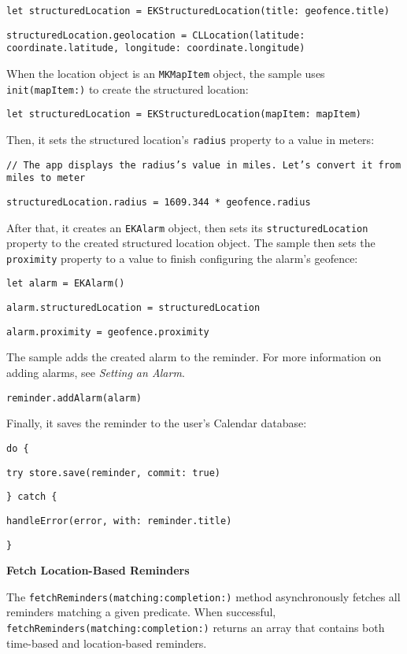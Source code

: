 \documentclass{article}
\begin{document}
\noindent
\texttt{let structuredLocation = EKStructuredLocation(title: geofence.title)}

\noindent
\texttt{structuredLocation.geolocation = CLLocation(latitude: coordinate.latitude, longitude: coordinate.longitude)}

\noindent
When the location object is an \texttt{MKMapItem} object, the sample uses \texttt{init(mapItem:)} to create the structured location:

\noindent
\texttt{let structuredLocation = EKStructuredLocation(mapItem: mapItem)}

\noindent
Then, it sets the structured location's \texttt{radius} property to a value in meters:

\noindent
\texttt{// The app displays the radius's value in miles. Let's convert it from miles to meter}

\noindent
\texttt{structuredLocation.radius = 1609.344 * geofence.radius}

\noindent
After that, it creates an \texttt{EKAlarm} object, then sets its \texttt{structuredLocation} property to the created structured location object. The sample then sets the \texttt{proximity} property to a value to finish configuring the alarm's geofence:

\noindent
\texttt{let alarm = EKAlarm()}

\noindent
\texttt{alarm.structuredLocation = structuredLocation}

\noindent
\texttt{alarm.proximity = geofence.proximity}

\noindent
The sample adds the created alarm to the reminder. For more information on adding alarms, see \textit{Setting an Alarm}.

\noindent
\texttt{reminder.addAlarm(alarm)}

\noindent
Finally, it saves the reminder to the user's Calendar database:

\noindent
\texttt{do \{}

\noindent
\texttt{try store.save(reminder, commit: true)}

\noindent
\texttt{\} catch \{}

\noindent
\texttt{handleError(error, with: reminder.title)}

\noindent
\texttt{\}}

\noindent
\textbf{Fetch Location-Based Reminders}

\noindent
The \texttt{fetchReminders(matching:completion:)} method asynchronously fetches all reminders matching a given predicate. When successful, \texttt{fetchReminders(matching:completion:)} returns an array that contains both time-based and location-based reminders.
\end{document}
